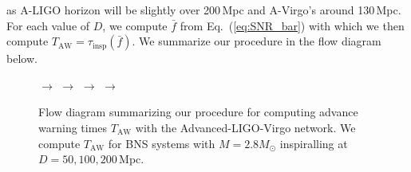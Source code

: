 \documentclass[prd,amsmath,amssymb,aps,floats,amsfonts,notitlepage,superscriptaddress,eqsecnum,nofootinbib,10pt]{revtex4-1}
\begin{document}
 as A-LIGO horizon will be slightly over 200\,Mpc and A-Virgo's around 130\,Mpc.
 For each value of $D$, we compute $\bar{f}$ from Eq.~(\ref{eq:SNR_bar}) with which we then compute $T_\text{AW}=\tau_\text{insp}(\bar{f})$.
 We summarize our procedure in the flow diagram below.
  \begin{figure}[ht!]
 $\longrightarrow$ 
 $\longrightarrow$   $\longrightarrow$  
 $\longrightarrow$  
  \caption{Flow diagram summarizing our procedure for computing advance warning times $T_\text{AW}$ with the Advanced-LIGO-Virgo network. 
  We compute $T_\text{AW}$ for BNS systems with $M=2.8M_\odot$ inspiralling at $D=50,100,200\,$Mpc. 
  }\label{fig:flow}
\end{figure}
\end{document}
